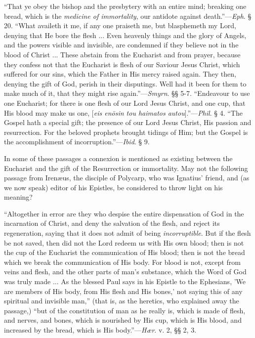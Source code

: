 ``That
ye obey the bishop and the presbytery with an entire mind; breaking
one bread, which is the \emph{medicine of immortality}, our antidote
against death.''—\emph{Eph}. § 20. ``What availeth it me, if any one
praiseth me, but blasphemeth my Lord, denying that He bore the flesh
... Even heavenly things and the glory of Angels, and the powers
visible and invisible, are condemned if they believe not
in the blood of Christ ... These abstain from the Eucharist and from
prayer, because they confess not that the Eucharist is flesh of our
Saviour Jesus Christ, which suffered for our sins, which the Father in
His mercy raised again. They then, denying the gift of God, perish in
their disputings. Well had it been for them to make much of it, that
they might rise again.''—\emph{Smyrn}. §§ 5-7. ``Endeavour to
use one Eucharist; for there is one flesh of our Lord Jesus Christ,
and one cup, that His blood may make us one, [\emph{eis en\={o}sin tou
haimatos autou}].''—\emph{Phil}. § 4. ``The Gospel hath a special
gift; the presence of our Lord Jesus Christ, His passion and
resurrection. For the beloved prophets brought tidings of Him; but the
Gospel is the accomplishment of incorruption.''—\emph{Ibid}. § 9.

In some of these passages a connexion is
mentioned as existing between the Eucharist and the gift of the
Resurrection or immortality. May not the following passage from Irenæus,
the disciple of Polycarp, who was Ignatius' friend, and (as we now
speak) editor of his Epistles, be considered to throw light on his
meaning?

``Altogether
in error are they who despise the entire dispensation of God in the
incarnation of Christ, and deny the salvation of the flesh, and reject
its regeneration, saying that it does not admit of being \emph{incorruptible}.
But if the flesh be not saved, then did not the Lord redeem us with
His own blood; then is not the cup of the Eucharist the communication
of His blood; then is not the bread which we break the communication
of His body. For blood is not, except from veins and flesh, and the
other parts of man's substance, which the Word of God was truly made
... As the blessed Paul says in his Epistle to the Ephesians, 'We are
members of His body, from His flesh and His bones,' not saying this of
any spiritual and invisible man,'' (that is, as the heretics, who
explained away the passage,) ``but of the constitution of man as he
really is, which is made of flesh, and nerves, and bones, which is
nourished by His cup, which is His blood, and increased by the bread,
which is His body.''—\emph{Hær}. v. 2, §§ 2, 3.

